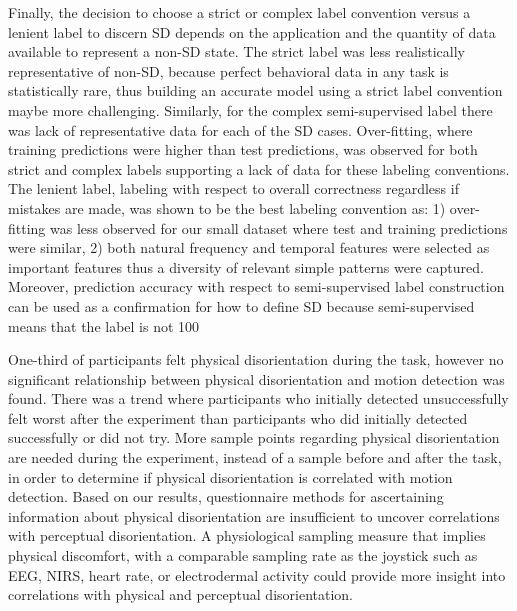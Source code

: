 \documentclass[11pt, onecolumn]{article}
\begin{document}
Finally, the decision to choose a strict or complex label convention versus a lenient label to discern SD depends on the application and the quantity of data available to represent a non-SD state.  The strict label was less realistically representative of non-SD, because perfect behavioral data in any task is statistically rare, thus building an accurate model using a strict label convention maybe more challenging. Similarly, for the complex semi-supervised label there was lack of representative data for each of the SD cases.  Over-fitting, where training predictions were higher than test predictions, was observed for both strict and complex labels supporting a lack of data for these labeling conventions.  The lenient label, labeling with respect to overall correctness regardless if mistakes are made, was shown to be the best labeling convention as: 1) over-fitting was less observed for our small dataset where test and training predictions were similar, 2) both natural frequency and temporal features were selected as important features thus a diversity of relevant simple patterns were captured.  Moreover, prediction accuracy with respect to semi-supervised label construction can be used as a confirmation for how to define SD because semi-supervised means that the label is not 100%

One-third of participants felt physical disorientation during the task, however no significant relationship between physical disorientation and motion detection was found.  There was a trend where participants who initially detected unsuccessfully felt worst after the experiment than participants who did initially detected successfully or did not try.  More sample points regarding physical disorientation are needed during the experiment, instead of a sample before and after the task, in order to determine if physical disorientation is correlated with motion detection.  Based on our results, questionnaire methods for ascertaining information about physical disorientation are insufficient to uncover correlations with perceptual disorientation.  A physiological sampling measure that implies physical discomfort, with a comparable sampling rate as the joystick such as EEG, NIRS, heart rate, or electrodermal activity could provide more insight into correlations with physical and perceptual disorientation.
\end{document}
